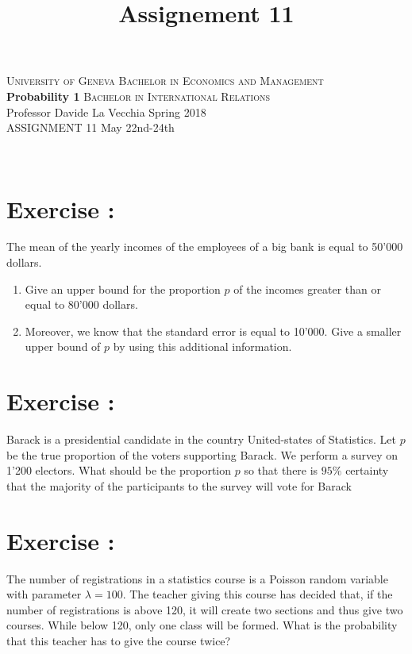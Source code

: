 \documentclass[12pt,thmsa]{article}
\title{Assignement 11}
\begin{document}
\noindent \textsc{University of Geneva}     \hfill \textsc{Bachelor in Economics and Management} \\
\textbf{Probability 1}                      \hfill \textsc{Bachelor in International Relations} \\
Professor Davide La Vecchia                 \hfill Spring 2018  \\
ASSIGNMENT 11                               \hfill   May 22nd-24th



\noindent
\makebox[\linewidth]{\rule{\textwidth}{0.4pt}}\\[1.5ex]




\addtocounter{section}{1}
\section*{Exercise \thesection:}

The mean of the yearly incomes of the employees of a big bank is equal to 50'000 dollars.
\begin{enumerate}
  \item Give an upper bound for the proportion $p$ of the incomes greater than or equal to 80'000 dollars.
  \item Moreover, we know that the standard error is equal to 10'000. Give a smaller upper bound of $p$
  by using this additional information.
\end{enumerate}


\addtocounter{section}{1}
\section*{Exercise \thesection:}

Barack is a presidential candidate in the country United-states of Statistics.
Let $p$ be the true proportion of the voters supporting Barack.
We perform a survey on 1'200 electors. What should be the proportion $p$ so that there is $95\%$ certainty that
the majority of the participants to the survey will vote for Barack

\addtocounter{section}{1}
\section*{Exercise \thesection:}

The number of registrations in a statistics course is a Poisson random variable with parameter $\lambda= 100$. The teacher giving this course has decided that, if the number of registrations is above 120, it will create two sections and thus give two courses. While below 120, only one class will be formed. What is the probability that this teacher has to give the course twice?
\end{document}
